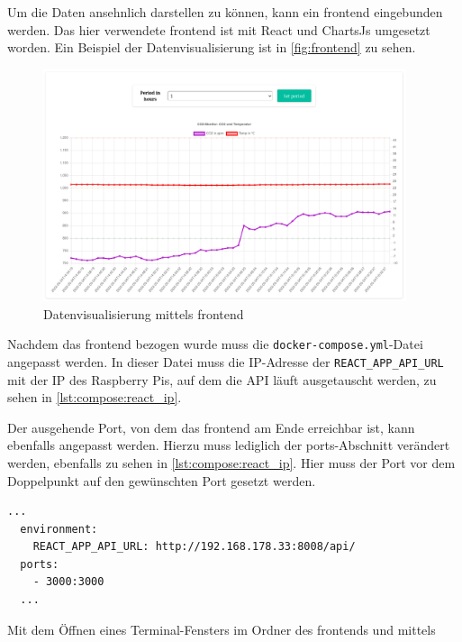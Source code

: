 \documentclass[a4paper,
    11pt,
    headings=small,
    ngerman,
    listof=totoc,
    numbers=noenddot]{scrreprt}[2021/11/13]
\begin{document}
Um die Daten ansehnlich darstellen zu können, kann ein \gls{frontend} eingebunden werden. Das hier verwendete \gls{frontend} ist mit React \autocite{reactjs} und ChartsJs \autocite{chart.js} umgesetzt worden. Ein Beispiel der Datenvisualisierung ist in \vref{fig:frontend} zu sehen.

\begin{figure}[htbp]
  \centering
  \includegraphics[width=0.95\textwidth]{pictures/Frontend.png}
  \caption{Datenvisualisierung mittels \gls{frontend}}
  \label{fig:frontend}
\end{figure}

Nachdem das \gls{frontend} bezogen wurde muss die \texttt{docker-compose.yml}-Datei angepasst werden. In dieser Datei muss die IP-Adresse der \texttt{REACT\_APP\_API\_URL} mit der IP des Raspberry Pis, auf dem die \ac{API} läuft ausgetauscht werden, zu sehen in \vref{lst:compose:react_ip}.

Der ausgehende Port, von dem das \gls{frontend} am Ende erreichbar ist, kann ebenfalls angepasst werden. Hierzu muss lediglich der ports-Abschnitt verändert werden, ebenfalls zu sehen in \vref{lst:compose:react_ip}. Hier muss der Port vor dem Doppelpunkt auf den gewünschten Port gesetzt werden.

\begin{lstlisting}[language=docker-compose-2,caption={Anpassen der \ac{API}-IP und des Ports in der docker-compose.yml},breaklines=true,label={lst:compose:react_ip}]
  ...
  environment:
    REACT_APP_API_URL: http://192.168.178.33:8008/api/
  ports:
    - 3000:3000
  ...
\end{lstlisting}

Mit dem Öffnen eines Terminal-Fensters im Ordner des \gls{frontend}s und mittels
\end{document}
